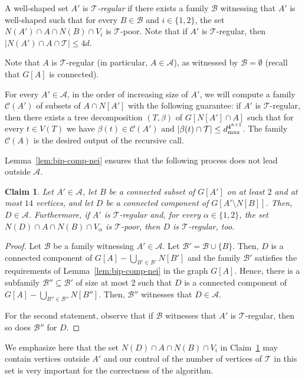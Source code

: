\documentclass[11pt,a4paper]{article}
\newtheorem{claim}[theorem]{Claim}
\theoremstyle{definition}
\def\T{\mathcal{T}}
\begin{document}
A well-shaped set $A'$ is \emph{$\T$-regular} if there exists a family $\mathcal{B}$
witnessing that $A'$ is well-shaped such that for every $B \in \mathcal{B}$
and $i \in \{1,2\}$, the set $N(A') \cap A \cap N(B) \cap V_i$ is $\T$-poor.
Note that if $A'$ is $\T$-regular, then $|N(A') \cap A \cap \T| \leq 4d$. 

Note that $A$ is $\T$-regular (in particular, $A \in \mathcal{A}$),
as witnessed by $\mathcal{B} = \emptyset$ (recall that $G[A]$ is connected).

For every $A' \in \mathcal{A}$, in the order of increasing size of $A'$,
we will compute a family $\mathcal{C}(A')$ of subsets of $A \cap N[A']$
with the following guarantee:
if $A'$ is $\T$-regular, then there exists a tree decomposition $(T,\beta)$ of $G[N[A'] \cap A]$
such that for every $t \in V(T)$ we have $\beta(t) \in \mathcal{C}(A')$
and $|\beta(t) \cap \T| \leq \bigbound^{4^{h+1}}$. 
The family $\mathcal{C}(A)$ is the desired output of the recursive call.

Lemma~\ref{lem:bip-comp-nei} ensures that the following process does not lead
outside $\mathcal{A}$.
\begin{claim}\label{cl:stay-in-A}
Let $A' \in \mathcal{A}$, let $B$ be a connected subset of $G[A']$ on at least $2$
and at most $14$ vertices, and let $D$ be a connected component of $G[A' \setminus N[B]]$.
Then, $D \in \mathcal{A}$. 
Furthermore, if $A'$ is $\T$-regular and, for every $\alpha \in \{1,2\}$, the
set $N(D) \cap A \cap N(B) \cap V_\alpha$ is $\T$-poor, then $D$ is $\T$-regular, too.
\end{claim}
\begin{proof}
    Let $\mathcal{B}$ be a family witnessing $A' \in \mathcal{A}$. 
    Let $\mathcal{B}' = \mathcal{B} \cup \{B\}$. 
    Then, $D$ is a connected component of $G[A]-\bigcup_{B' \in \mathcal{B}'} N[B']$
    and the family $\mathcal{B}'$ satisfies the requirements of Lemma~\ref{lem:bip-comp-nei} in the graph $G[A]$.
    Hence, there is a subfamily $\mathcal{B}'' \subseteq \mathcal{B}'$ of size at most $2$
    such that $D$ is a connected component of $G[A]-\bigcup_{B'' \in \mathcal{B}''} N[B'']$.
    Then, $\mathcal{B}''$ witnesses that $D \in \mathcal{A}$.

    For the second statement, observe that if $\mathcal{B}$ witnesses that $A'$ is $\T$-regular,
    then so does $\mathcal{B}''$ for $D$. 
\end{proof}
We emphasize here that the set $N(D) \cap A \cap N(B) \cap V_i$ in Claim~\ref{cl:stay-in-A} may contain
vertices outside $A'$ and our control of the number of vertices of $\T$ in this set
is very important for the correctness of the algorithm.
\end{document}
